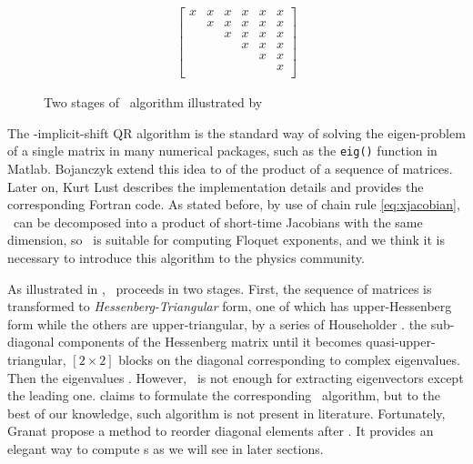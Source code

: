 \documentclass[final,leqno,onefignum,onetabnum]{siamltexmm}
\begin{document}
\begin{figure}
\begin{align*}
\begin{bmatrix}
      x & x & x & x & x & x \\
      & x & x & x & x & x \\
      &   & x & x & x & x \\
      &   &   & x & x & x \\
      &   &   &   & x & x \\
      &   &   &   &   & x \\
    \end{bmatrix}
  \end{align*}
  \caption{Two stages of \psd\ algorithm illustrated by
    }
  \label{fig:PSD}
\end{figure}
The -implicit-shift QR algorithm
is the standard way
of solving the eigen-problem of a single matrix in many numerical packages,
such as the
\texttt{eig()} function in Matlab.
Bojanczyk \edit{\etal}
extend this
idea to  of the product of a sequence of matrices. Later on,
Kurt Lust describes the implementation details and provides
the corresponding
Fortran code.
As stated before, by use of chain rule \eqref{eq:xjacobian},
\JacobianM\ can be decomposed into a product of short-time
Jacobians with the same dimension, so \psd\ is suitable for computing
Floquet exponents, and we think it is necessary to introduce this algorithm
to the physics community.

As illustrated in , \psd\ proceeds in two stages.
First, the sequence
of matrices is transformed to \emph{Hessenberg-Triangular} form,
one of which has upper-Hessenberg form while the others
are upper-triangular,
by a series of Householder .
 the sub-diagonal components of
the Hessenberg matrix until it becomes quasi-upper-triangular,
$[2\!\times\! 2]$ blocks on the diagonal corresponding to
complex eigenvalues. Then the eigenvalues .
However, \psd\ is not enough for extracting eigenvectors except the leading one.
 claims to formulate the corresponding
 \Fv\ algorithm, but to
the best of our knowledge, such algorithm is not present in literature.
Fortunately, Granat \edit{\etal} propose a method to reorder diagonal elements
after \psd. It provides an elegant way to compute \Fv s as we will see in
later sections.
\end{document}
